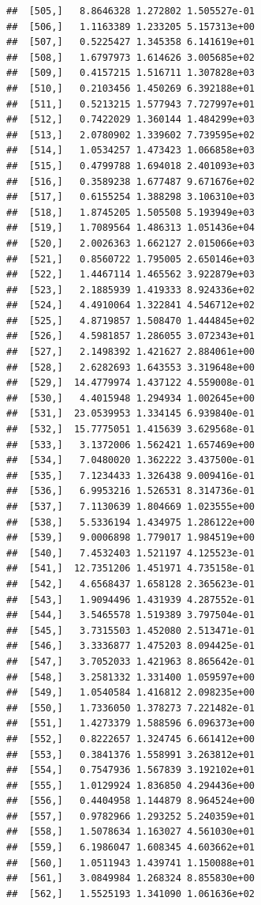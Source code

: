\documentclass[article]{jss}\usepackage[]{graphicx}\usepackage[]{xcolor}
\makeatletter
\newenvironment{kframe}{%
 \def\at@end@of@kframe{}%
 \ifinner\ifhmode%
  \def\at@end@of@kframe{\end{minipage}}%
  \begin{minipage}{\columnwidth}%
 \fi\fi%
 \def\FrameCommand##1{\hskip\@totalleftmargin \hskip-\fboxsep
 \colorbox{shadecolor}{##1}\hskip-\fboxsep
     \hskip-\linewidth \hskip-\@totalleftmargin \hskip\columnwidth}%
 \MakeFramed {\advance\hsize-\width
   \@totalleftmargin\z@ \linewidth\hsize
   \@setminipage}}%
 {\par\unskip\endMakeFramed%
 \at@end@of@kframe}
\newenvironment{knitrout}{}{} %
\makeatother
\begin{document}
\begin{knitrout}
\begin{kframe}
\begin{verbatim}
##  [505,]   8.8646328 1.272802 1.505527e-01
##  [506,]   1.1163389 1.233205 5.157313e+00
##  [507,]   0.5225427 1.345358 6.141619e+01
##  [508,]   1.6797973 1.614626 3.005685e+02
##  [509,]   0.4157215 1.516711 1.307828e+03
##  [510,]   0.2103456 1.450269 6.392188e+01
##  [511,]   0.5213215 1.577943 7.727997e+01
##  [512,]   0.7422029 1.360144 1.484299e+03
##  [513,]   2.0780902 1.339602 7.739595e+02
##  [514,]   1.0534257 1.473423 1.066858e+03
##  [515,]   0.4799788 1.694018 2.401093e+03
##  [516,]   0.3589238 1.677487 9.671676e+02
##  [517,]   0.6155254 1.388298 3.106310e+03
##  [518,]   1.8745205 1.505508 5.193949e+03
##  [519,]   1.7089564 1.486313 1.051436e+04
##  [520,]   2.0026363 1.662127 2.015066e+03
##  [521,]   0.8560722 1.795005 2.650146e+03
##  [522,]   1.4467114 1.465562 3.922879e+03
##  [523,]   2.1885939 1.419333 8.924336e+02
##  [524,]   4.4910064 1.322841 4.546712e+02
##  [525,]   4.8719857 1.508470 1.444845e+02
##  [526,]   4.5981857 1.286055 3.072343e+01
##  [527,]   2.1498392 1.421627 2.884061e+00
##  [528,]   2.6282693 1.643553 3.319648e+00
##  [529,]  14.4779974 1.437122 4.559008e-01
##  [530,]   4.4015948 1.294934 1.002645e+00
##  [531,]  23.0539953 1.334145 6.939840e-01
##  [532,]  15.7775051 1.415639 3.629568e-01
##  [533,]   3.1372006 1.562421 1.657469e+00
##  [534,]   7.0480020 1.362222 3.437500e-01
##  [535,]   7.1234433 1.326438 9.009416e-01
##  [536,]   6.9953216 1.526531 8.314736e-01
##  [537,]   7.1130639 1.804669 1.023555e+00
##  [538,]   5.5336194 1.434975 1.286122e+00
##  [539,]   9.0006898 1.779017 1.984519e+00
##  [540,]   7.4532403 1.521197 4.125523e-01
##  [541,]  12.7351206 1.451971 4.735158e-01
##  [542,]   4.6568437 1.658128 2.365623e-01
##  [543,]   1.9094496 1.431939 4.287552e-01
##  [544,]   3.5465578 1.519389 3.797504e-01
##  [545,]   3.7315503 1.452080 2.513471e-01
##  [546,]   3.3336877 1.475203 8.094425e-01
##  [547,]   3.7052033 1.421963 8.865642e-01
##  [548,]   3.2581332 1.331400 1.059597e+00
##  [549,]   1.0540584 1.416812 2.098235e+00
##  [550,]   1.7336050 1.378273 7.221482e-01
##  [551,]   1.4273379 1.588596 6.096373e+00
##  [552,]   0.8222657 1.324745 6.661412e+00
##  [553,]   0.3841376 1.558991 3.263812e+01
##  [554,]   0.7547936 1.567839 3.192102e+01
##  [555,]   1.0129924 1.836850 4.294436e+00
##  [556,]   0.4404958 1.144879 8.964524e+00
##  [557,]   0.9782966 1.293252 5.240359e+01
##  [558,]   1.5078634 1.163027 4.561030e+01
##  [559,]   6.1986047 1.608345 4.603662e+01
##  [560,]   1.0511943 1.439741 1.150088e+01
##  [561,]   3.0849984 1.268324 8.855830e+00
##  [562,]   1.5525193 1.341090 1.061636e+02

\end{verbatim}
\end{kframe}
\end{knitrout}
\end{document}

